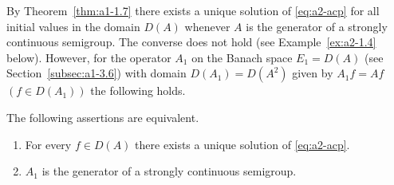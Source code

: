 By Theorem~\ref{thm:a1-1.7} there exists a unique solution of \eqref{eq:a2-acp} for all initial values in the domain $D(A)$ whenever $A$ is the generator of a strongly continuous semigroup.
The converse does not hold (see Example~\ref{ex:a2-1.4} below).
However, for the operator $A_{1}$ on the Banach space $E_{1} = D(A)$ 
(see Section~\ref{subsec:a1-3.6}) with domain 
$D(A_{1}) = D(A^{2})$ given by $A_{1}f = Af$ $(f \in D(A_{1}))$ the following holds.
\begin{theorem}\label{thm:a2-1.1}
The following assertions are equivalent.
\begin{enumerate}[\upshape (a)]

\item \label{thm:a2-1.1-1}
For every $f \in D(A)$ there exists a unique solution of \eqref{eq:a2-acp}.

\item \label{thm:a2-1.1-2}
$A_{1}$ is the generator of a strongly continuous semigroup.
\end{enumerate}
\end{theorem}

